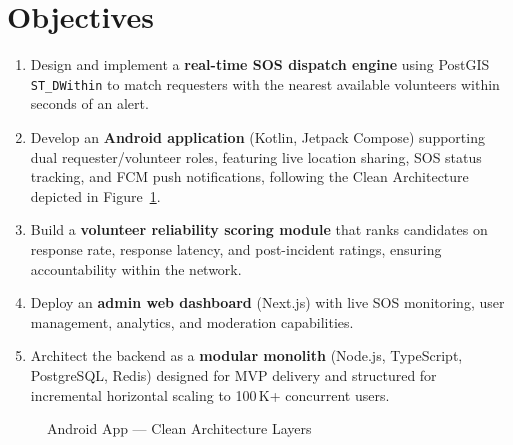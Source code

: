 \documentclass[12pt]{article}
\begin{document}
\section{Objectives}
\begin{enumerate}[nosep, leftmargin=1.4em]
  \item Design and implement a \textbf{real-time SOS dispatch engine} using PostGIS \texttt{ST\_DWithin} to match requesters with the nearest available volunteers within seconds of an alert.
  \item Develop an \textbf{Android application} (Kotlin, Jetpack Compose) supporting dual requester/volunteer roles, featuring live location sharing, SOS status tracking, and FCM push notifications, following the Clean Architecture depicted in Figure~\ref{fig:android}.
  \item Build a \textbf{volunteer reliability scoring module} that ranks candidates on response rate, response latency, and post-incident ratings, ensuring accountability within the network.
  \item Deploy an \textbf{admin web dashboard} (Next.js) with live SOS monitoring, user management, analytics, and moderation capabilities.
  \item Architect the backend as a \textbf{modular monolith} (Node.js, TypeScript, PostgreSQL, Redis) designed for MVP delivery and structured for incremental horizontal scaling to 100\,K+ concurrent users.
\end{enumerate}

\vspace{0.1cm}
\begin{figure}[h]
\centering
{}
\caption{Android App --- Clean Architecture Layers}
\label{fig:android}
\end{figure}
\end{document}
